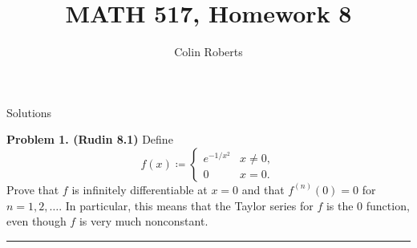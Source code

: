 \documentclass[leqno]{article}
\author{Colin Roberts}
\title{MATH 517, Homework 8}
\theoremstyle{nonumberplain}
\begin{document}
\maketitle
\begin{large}
\begin{center}
Solutions
\end{center}
\end{large}
\pagebreak


\noindent\textbf{Problem 1. (Rudin 8.1)} Define 
\[
f(x)\coloneq \begin{cases}
e^{-1/x^2} & x\neq 0,\\
0 & x=0.
\end{cases}
\] 
Prove that $f$ is infinitely differentiable at $x=0$ and that $f^{(n)}(0)=0$ for $n=1,2,\dots$. In particular, this means that the Taylor series for $f$ is the $0$ function, even though $f$ is very much nonconstant.

\noindent\rule[0.5ex]{\linewidth}{1pt}
\end{document}
